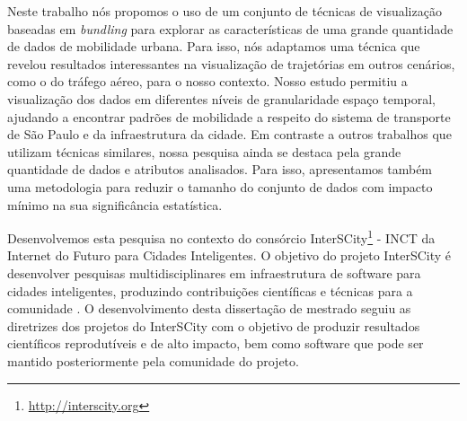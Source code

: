 Neste trabalho nós propomos o uso de um conjunto de técnicas de visualização
baseadas em \emph{bundling} para explorar as características de uma grande
quantidade de dados de mobilidade urbana. Para isso, nós adaptamos uma técnica
que revelou resultados interessantes na visualização de trajetórias em outros
cenários, como o do tráfego aéreo, para o nosso contexto. Nosso estudo permitiu
a visualização dos dados em diferentes níveis de granularidade espaço temporal,
ajudando a encontrar padrões de mobilidade a respeito do sistema de transporte
de S\~ao Paulo e da infraestrutura da cidade. Em contraste a outros trabalhos
que utilizam técnicas similares, nossa pesquisa ainda se destaca pela grande
quantidade de dados e atributos analisados. Para isso, apresentamos também uma
metodologia para reduzir o tamanho do conjunto de dados com impacto mínimo na
sua significância estatística.

Desenvolvemos esta pesquisa no contexto do consórcio
InterSCity\footnote{\url{http://interscity.org}} - INCT da Internet do Futuro
para Cidades Inteligentes. O objetivo do projeto InterSCity é desenvolver
pesquisas multidisciplinares em infraestrutura de software para cidades
inteligentes, produzindo contribuições científicas e técnicas para a comunidade
\citep{Daniel2016}. O desenvolvimento desta dissertação de mestrado seguiu as
diretrizes dos projetos do InterSCity com o objetivo de produzir resultados
científicos reprodutíveis e de alto impacto, bem como software 
que pode ser mantido posteriormente pela comunidade do projeto.

